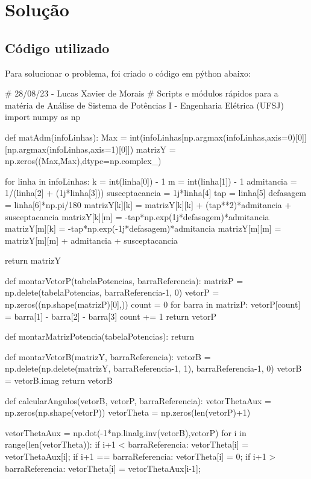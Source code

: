 \section{Solução}

\subsection{Código utilizado}

Para solucionar o problema, foi criado o código em pýthon abaixo:\\

\begin{python}
# 28/08/23 - Lucas Xavier de Morais
# Scripts e módulos rápidos para a matéria de Análise de Sistema de Potências I - Engenharia Elétrica (UFSJ)
import numpy as np

def matAdm(infoLinhas):
    Max = int(infoLinhas[np.argmax(infoLinhas,axis=0)[0]][np.argmax(infoLinhas,axis=1)[0]])
    matrizY = np.zeros((Max,Max),dtype=np.complex_)

    for linha in infoLinhas: 
        k = int(linha[0]) - 1
        m = int(linha[1]) - 1
        admitancia = 1/(linha[2] + (1j*linha[3]))
        susceptacancia = 1j*linha[4]
        tap = linha[5]
        defasagem = linha[6]*np.pi/180
        matrizY[k][k] = matrizY[k][k] + (tap**2)*admitancia + susceptacancia
        matrizY[k][m] = -tap*np.exp(1j*defasagem)*admitancia
        matrizY[m][k] = -tap*np.exp(-1j*defasagem)*admitancia
        matrizY[m][m] = matrizY[m][m] + admitancia + susceptacancia
    
    return matrizY

def montarVetorP(tabelaPotencias, barraReferencia):
    matrizP = np.delete(tabelaPotencias, barraReferencia-1, 0) 
    vetorP = np.zeros((np.shape(matrizP)[0],))
    count = 0
    for barra in matrizP:
        vetorP[count] = barra[1] - barra[2] - barra[3]
        count += 1
    return vetorP

def montarMatrizPotencia(tabelaPotencias):
    return

def montarVetorB(matrizY, barraReferencia):
    vetorB = np.delete(np.delete(matrizY, barraReferencia-1, 1), barraReferencia-1, 0)
    vetorB = vetorB.imag
    return vetorB

def calcularAngulos(vetorB, vetorP, barraReferencia):
    vetorThetaAux = np.zeros(np.shape(vetorP))
    vetorTheta = np.zeros(len(vetorP)+1)

    vetorThetaAux = np.dot(-1*np.linalg.inv(vetorB),vetorP)
    for i in range(len(vetorTheta)):
        if i+1 < barraReferencia: vetorTheta[i] = vetorThetaAux[i];  
        if i+1 == barraReferencia: vetorTheta[i] = 0;  
        if i+1 > barraReferencia: vetorTheta[i] = vetorThetaAux[i-1];  


\end{python}
